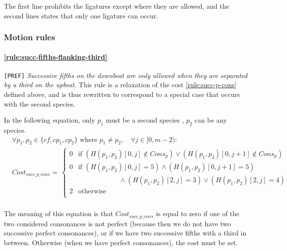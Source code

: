     The first line prohibits the ligatures except where they are allowed, and the second lines states that only one ligature can occur.

\subsubsection{Motion rules}
\paragraph{\hspace{.6cm}\ref{rule:succ-fifths-flanking-third}} \texttt{[PREF]} \textit{Successive fifths on the downbeat are only allowed when they are separated by a third on the upbeat.}    
    This rule is a relaxation of the cost \ref{rule:succ-p-cons} defined above, and is thus rewritten to correspond to a special case that occurs with the second species.
        
    In the following equation, only $p_1$ must be a second species \cp, $p_2$ can be any species.
    \begin{equation}
        \begin{aligned}
            & \forall p_1, p_2 \in \{cf, cp_1, cp_2\} \text{ where }  p_1 \neq p_2, \quad \forall j \in [0, m-2): \\
            &Cost_{succ\_p\_cons} = \,  
            \begin{cases}
                0 & \text{if } (H(p_1, p_2)[0, j] \notin Cons_p) \lor (H(p_1, p_2)[0, j+1] \notin Cons_p)\\
                0 & \text{if } (H(p_1, p_2)[0, j] = 5 ) \land (H(p_1, p_2)[0, j+1] = 5) \\
                & \quad \quad \quad \quad \quad \quad\land (H(p_1, p_2)[2, j] = 3) \lor (H(p_1, p_2)[2, j] = 4)\\
                2 & \text{otherwise } \\
            \end{cases}\\
        \end{aligned}
    \end{equation}

    The meaning of this equation is that $Cost_{succ\_p\_cons}$ is equal to zero if one of the two considered consonances is not perfect (because then we do not have two successive perfect consonances), or if we have two successive fifths with a third in between. Otherwise (when we have perfect consonances), the cost must be set.

